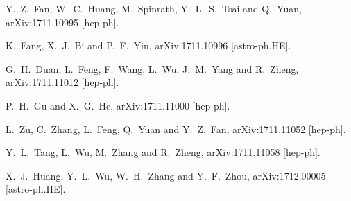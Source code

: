 \documentclass[aps,prd,letterpaper,showpacs,twocolumn,preprintnumbers,floatfix,superscriptaddress]{revtex4-1}
\begin{document}
\begin{thebibliography}{99}
  
  Y.~Z.~Fan, W.~C.~Huang, M.~Spinrath, Y.~L.~S.~Tsai and Q.~Yuan,
  arXiv:1711.10995 [hep-ph].
  


  K.~Fang, X.~J.~Bi and P.~F.~Yin,
  arXiv:1711.10996 [astro-ph.HE].
  
  
  G.~H.~Duan, L.~Feng, F.~Wang, L.~Wu, J.~M.~Yang and R.~Zheng,
  arXiv:1711.11012 [hep-ph].
  
  P.~H.~Gu and X.~G.~He,
  arXiv:1711.11000 [hep-ph].
  
  L.~Zu, C.~Zhang, L.~Feng, Q.~Yuan and Y.~Z.~Fan,
  arXiv:1711.11052 [hep-ph].
  
  Y.~L.~Tang, L.~Wu, M.~Zhang and R.~Zheng,
  arXiv:1711.11058 [hep-ph].
  
  X.~J.~Huang, Y.~L.~Wu, W.~H.~Zhang and Y.~F.~Zhou,
  arXiv:1712.00005 [astro-ph.HE].
  

\end{thebibliography}
\end{document}
